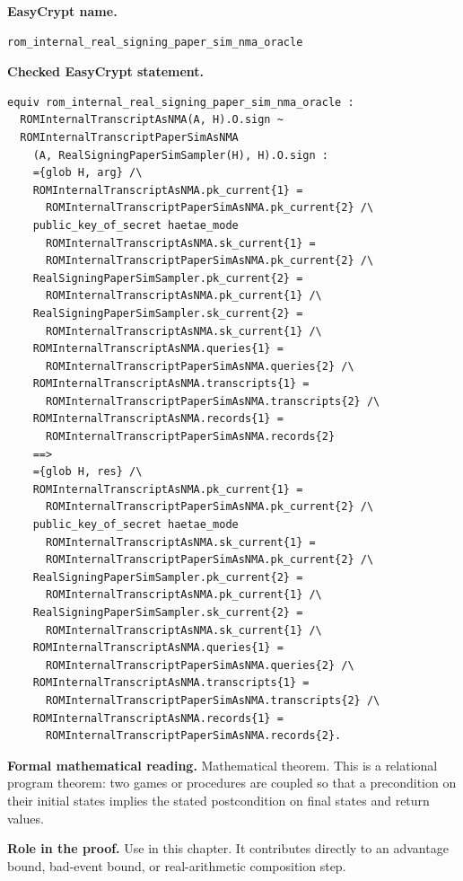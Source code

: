 \begin{formaltheorem}
\noindent\textbf{EasyCrypt name.}
\begin{lstlisting}[language=EasyCrypt,basicstyle=\ttfamily\scriptsize]
rom_internal_real_signing_paper_sim_nma_oracle
\end{lstlisting}
\noindent\textbf{Checked EasyCrypt statement.}
\begin{lstlisting}[language=EasyCrypt,basicstyle=\ttfamily\scriptsize]
equiv rom_internal_real_signing_paper_sim_nma_oracle :
  ROMInternalTranscriptAsNMA(A, H).O.sign ~
  ROMInternalTranscriptPaperSimAsNMA
    (A, RealSigningPaperSimSampler(H), H).O.sign :
    ={glob H, arg} /\
    ROMInternalTranscriptAsNMA.pk_current{1} =
      ROMInternalTranscriptPaperSimAsNMA.pk_current{2} /\
    public_key_of_secret haetae_mode
      ROMInternalTranscriptAsNMA.sk_current{1} =
      ROMInternalTranscriptPaperSimAsNMA.pk_current{2} /\
    RealSigningPaperSimSampler.pk_current{2} =
      ROMInternalTranscriptAsNMA.pk_current{1} /\
    RealSigningPaperSimSampler.sk_current{2} =
      ROMInternalTranscriptAsNMA.sk_current{1} /\
    ROMInternalTranscriptAsNMA.queries{1} =
      ROMInternalTranscriptPaperSimAsNMA.queries{2} /\
    ROMInternalTranscriptAsNMA.transcripts{1} =
      ROMInternalTranscriptPaperSimAsNMA.transcripts{2} /\
    ROMInternalTranscriptAsNMA.records{1} =
      ROMInternalTranscriptPaperSimAsNMA.records{2}
    ==>
    ={glob H, res} /\
    ROMInternalTranscriptAsNMA.pk_current{1} =
      ROMInternalTranscriptPaperSimAsNMA.pk_current{2} /\
    public_key_of_secret haetae_mode
      ROMInternalTranscriptAsNMA.sk_current{1} =
      ROMInternalTranscriptPaperSimAsNMA.pk_current{2} /\
    RealSigningPaperSimSampler.pk_current{2} =
      ROMInternalTranscriptAsNMA.pk_current{1} /\
    RealSigningPaperSimSampler.sk_current{2} =
      ROMInternalTranscriptAsNMA.sk_current{1} /\
    ROMInternalTranscriptAsNMA.queries{1} =
      ROMInternalTranscriptPaperSimAsNMA.queries{2} /\
    ROMInternalTranscriptAsNMA.transcripts{1} =
      ROMInternalTranscriptPaperSimAsNMA.transcripts{2} /\
    ROMInternalTranscriptAsNMA.records{1} =
      ROMInternalTranscriptPaperSimAsNMA.records{2}.
\end{lstlisting}
\noindent\textbf{Formal mathematical reading.}
Mathematical theorem. This is a relational program theorem: two games or procedures are coupled so that a precondition on their initial states implies the stated postcondition on final states and return values.

\noindent\textbf{Role in the proof.}
Use in this chapter. It contributes directly to an advantage bound, bad-event bound, or real-arithmetic composition step.


\end{formaltheorem}
